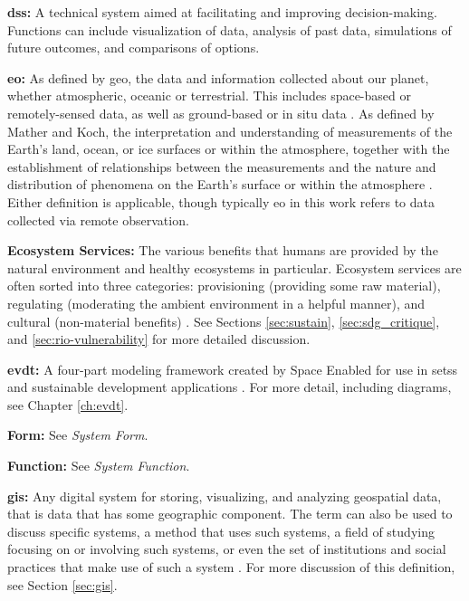 \textbf{\acf{dss}:} A technical system aimed at facilitating and improving decision-making. Functions can include visualization of data, analysis of past data, simulations of future outcomes, and comparisons of options.

\textbf{\acf{eo}:} As defined by \ac{geo}, the data and information collected about our planet, whether atmospheric, oceanic or terrestrial. This includes space-based or remotely-sensed data, as well as ground-based or in situ data \cite{grouponearthobservationsGEOGlance2019}. As defined by Mather and Koch, the interpretation and understanding of measurements of the Earth's land, ocean, or ice surfaces or within the atmosphere, together with the establishment of relationships between the measurements and the nature and distribution of phenomena on the Earth's surface or within the atmosphere \cite{matherComputerProcessingRemotelySensed2011}. Either definition is applicable, though typically \ac{eo} in this work refers to data collected via remote observation.

\textbf{Ecosystem Services:} The various benefits that humans are provided by the natural environment and healthy ecosystems in particular. Ecosystem services are often sorted into three categories: provisioning (providing some raw material), regulating (moderating the ambient environment in a helpful manner), and cultural (non-material benefits) \cite{haines-youngCommonInternationalClassification2018}. See Sections \ref{sec:sustain}, \ref{sec:sdg_critique}, and \ref{sec:rio-vulnerability} for more detailed discussion.

\textbf{\acf{evdt}:} A four-part modeling framework created by Space Enabled for use in \acp{sets} and sustainable development applications \cite{reidCombiningSocialEnvironmental2019}. For more detail, including diagrams, see Chapter \ref{ch:evdt}.

\textbf{Form:} See \textit{System Form}.

\textbf{Function:} See \textit{System Function}.

\textbf{\acf{gis}:} Any digital system for storing, visualizing, and analyzing geospatial data, that is data that has some geographic component. The term can also be used to discuss specific systems, a method that uses such systems, a field of studying focusing on or involving such systems, or even the set of institutions and social practices that make use of such a system \cite{sheppardGISSocietyResearch1995}. For more discussion of this definition, see Section \ref{sec:gis}.

